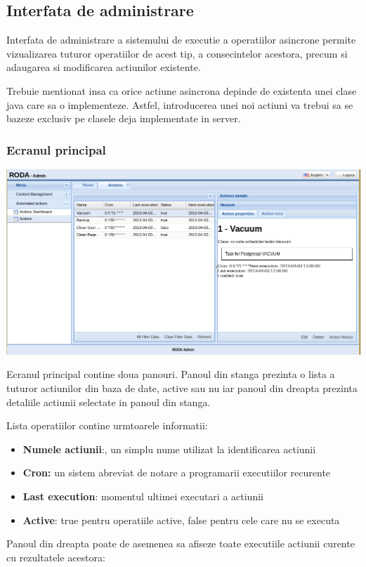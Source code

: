
\subsection{Interfata de administrare}

Interfata de administrare a sistemului de executie a operatiilor asincrone
permite vizualizarea tuturor operatiilor de acest tip, a consecintelor
acestora, precum si adaugarea si modificarea actiunilor existente. 

Trebuie mentionat insa ca orice actiune asincrona depinde de existenta
unei clase java care sa o implementeze. Astfel, introducerea unei
noi actiuni va trebui sa se bazeze exclusiv pe clasele deja implementate
in server. 


\subsubsection{Ecranul principal }

\includegraphics[width=\textwidth]{actionsview}

Ecranul principal contine doua panouri. Panoul din stanga prezinta
o lista a tuturor actiunilor din baza de date, active sau nu iar panoul
din dreapta prezinta detaliile actiunii selectate in panoul din stanga. 

Lista operatiilor contine urmtoarele informatii: 
\begin{itemize}
\item \textbf{Numele actiunii}:, un simplu nume utilizat la identificarea
actiunii 
\item \textbf{Cron:} un sistem abreviat de notare a programarii executiilor
recurente 
\item \textbf{Last execution}: momentul ultimei executari a actiunii 
\item \textbf{Active}: true pentru operatiile active, false pentru cele
care nu se executa
\end{itemize}
Panoul din dreapta poate de asemenea sa afiseze toate executiile actiunii
curente cu rezultatele acestora: 


